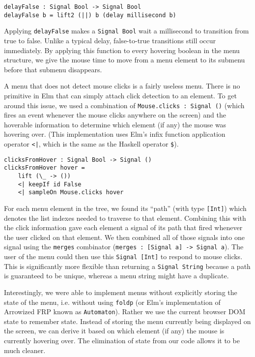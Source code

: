 \documentclass{article}
\begin{document}
\begin{verbatim}
delayFalse : Signal Bool -> Signal Bool
delayFalse b = lift2 (||) b (delay millisecond b)
\end{verbatim}

Applying \texttt{delayFalse} makes a \texttt{Signal Bool} wait a millisecond to
transition from true to false. Unlike a typical delay, false-to-true transitions
still occur immediately. By applying this function to every hovering boolean in
the menu structure, we give the mouse time to move from a menu element to its
submenu before that submenu disappears.

A menu that does not detect mouse clicks is a fairly useless menu. There is no
primitive in Elm that can simply attach click detection to an element. To get
around this issue, we used a combination of \texttt{Mouse.clicks : Signal ()}
(which fires an event whenever the mouse clicks anywhere on the screen) and the
hoverable information to determine which element (if any) the mouse was hovering
over. (This implementation uses Elm's infix function application operator
\texttt{<|}, which is the same as the Haskell operator \texttt{\$}).

\begin{verbatim}
clicksFromHover : Signal Bool -> Signal ()
clicksFromHover hover =
    lift (\_ -> ())
    <| keepIf id False
    <| sampleOn Mouse.clicks hover
\end{verbatim}

For each menu element in the tree, we found its ``path'' (with type
\texttt{[Int]}) which denotes the list indexes needed to traverse to that
element. Combining this with the click information gave each element a signal of
its path that fired whenever the user clicked on that element. We then combined
all of those signals into one signal using the \texttt{merges} combinator
(\texttt{merges : [Signal a] -> Signal a}). The user of the menu could then use
this \texttt{Signal [Int]} to respond to mouse clicks. This is significantly
more flexible than returning a \texttt{Signal String} because a path is
guaranteed to be unique, whereas a menu string might have a duplicate.

Interestingly, we were able to implement menus without explicitly storing the
state of the menu, i.e. without using \texttt{foldp} (or Elm's implementation of
Arrowized FRP known as \texttt{Automaton}). Rather we use the current browser
DOM state to remember state. Instead of storing the menu currently being
displayed on the screen, we can derive it based on which element (if any) the
mouse is currently hovering over. The elimination of state from our code allows
it to be much cleaner.
\end{document}
